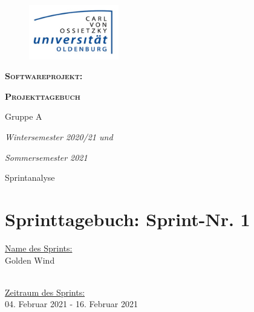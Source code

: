 \documentclass[12pt,a4paper, oneside]{article}
\author{Uni Oldenburg, SWP2020 Gruppe A}
\begin{document}
    \begin{titlepage}
        \pagestyle{empty}
        \begin{center}

            \begin{figure}[h]
                \centering
                \includegraphics[width=0.35\textwidth]{../img/Logo.jpg}
            \end{figure}

            \bigskip \bigskip \noindent
            \textsc{\textbf{\LARGE Softwareprojekt:}} \par \bigskip \noindent
            \textsc{\textbf{\LARGE Projekttagebuch}}


            \par \bigskip \bigskip \bigskip \bigskip \bigskip \noindent
            {\Large Gruppe A} \par \medskip \noindent

            \par \bigskip \bigskip \bigskip \bigskip \bigskip \bigskip \noindent
            \textit{\Large Wintersemester 2020/21 und} \par \noindent
            \textit{\Large Sommersemester 2021}

            \par \bigskip \bigskip \bigskip \bigskip \bigskip \bigskip \noindent
            \par \bigskip \bigskip \bigskip \noindent
            {\Large Sprintanalyse} \par \medskip \noindent

        \end{center}
    \end{titlepage}

    \tableofcontents
    \pagebreak


    \section{Sprinttagebuch: Sprint-Nr. 1}
    \underline{Name des Sprints:}
    \\
    Golden Wind

    \noindent
    \\
    \underline{Zeitraum des Sprints:}
    \\
    04. Februar 2021 - 16. Februar 2021
\end{document}
